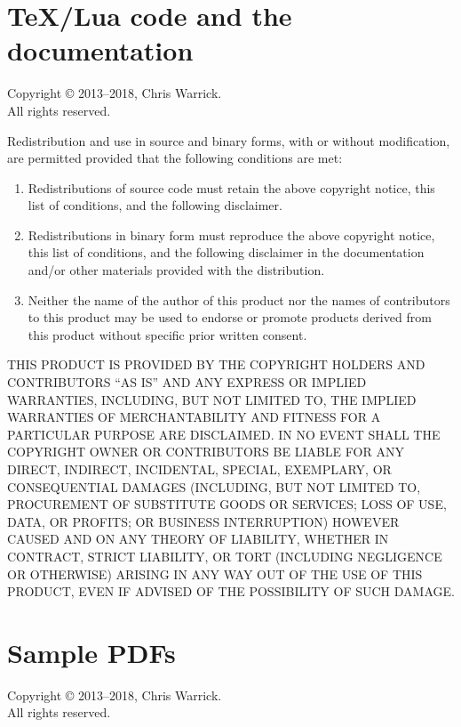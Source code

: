 \documentclass[a4paper,english]{report}
\numberwithin{equation}{section}
\begin{document}
\section{\TeX{}/Lua code and the documentation}

Copyright © 2013–2018, Chris Warrick.  \\
All rights reserved.

Redistribution and use in source and binary forms, with or without
modification, are permitted provided that the following conditions are
met:

\begin{enumerate}
\item Redistributions of source code must retain the above copyright
   notice, this list of conditions, and the following disclaimer.

\item Redistributions in binary form must reproduce the above copyright
   notice, this list of conditions, and the following disclaimer in the
   documentation and/or other materials provided with the distribution.

\item Neither the name of the author of this product nor the names of
   contributors to this product may be used to endorse or promote
   products derived from this product without specific prior written
   consent.
\end{enumerate}

THIS PRODUCT IS PROVIDED BY THE COPYRIGHT HOLDERS AND CONTRIBUTORS
“AS IS” AND ANY EXPRESS OR IMPLIED WARRANTIES, INCLUDING, BUT NOT
LIMITED TO, THE IMPLIED WARRANTIES OF MERCHANTABILITY AND FITNESS FOR
A PARTICULAR PURPOSE ARE DISCLAIMED.  IN NO EVENT SHALL THE COPYRIGHT
OWNER OR CONTRIBUTORS BE LIABLE FOR ANY DIRECT, INDIRECT, INCIDENTAL,
SPECIAL, EXEMPLARY, OR CONSEQUENTIAL DAMAGES (INCLUDING, BUT NOT
LIMITED TO, PROCUREMENT OF SUBSTITUTE GOODS OR SERVICES; LOSS OF USE,
DATA, OR PROFITS; OR BUSINESS INTERRUPTION) HOWEVER CAUSED AND ON ANY
THEORY OF LIABILITY, WHETHER IN CONTRACT, STRICT LIABILITY, OR TORT
(INCLUDING NEGLIGENCE OR OTHERWISE) ARISING IN ANY WAY OUT OF THE USE
OF THIS PRODUCT, EVEN IF ADVISED OF THE POSSIBILITY OF SUCH DAMAGE.

\pagebreak

\section{Sample PDFs}

Copyright © 2013–2018, Chris Warrick. \\
All rights reserved.
\end{document}
